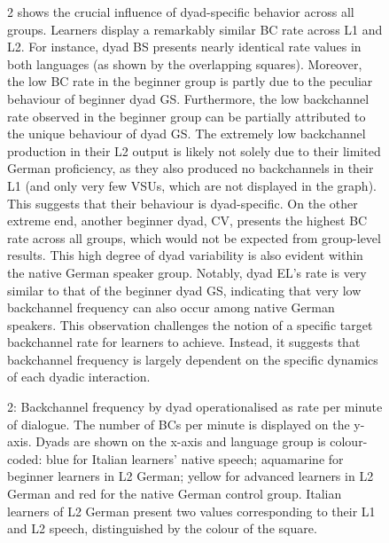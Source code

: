 \begin{figure}
\caption{2 shows the crucial influence of dyad-specific behavior across all groups. Learners display a remarkably similar BC rate across L1 and L2. For instance, dyad BS presents nearly identical rate values in both languages (as shown by the overlapping squares). Moreover, the low BC rate in the beginner group is partly due to the peculiar behaviour of beginner dyad GS. Furthermore, the low backchannel rate observed in the beginner group can be partially attributed to the unique behaviour of dyad GS. The extremely low backchannel production in their L2 output is likely not solely due to their limited German proficiency, as they also produced no backchannels in their L1 (and only very few VSUs, which are not displayed in the graph). This suggests that their behaviour is dyad-specific. On the other extreme end, another beginner dyad, CV, presents the highest BC rate across all groups, which would not be expected from group-level results. This high degree of dyad variability is also evident within the native German speaker group. Notably, dyad EL's rate is very similar to that of the beginner dyad GS, indicating that very low backchannel frequency can also occur among native German speakers. This observation challenges the notion of a specific target backchannel rate for learners to achieve. Instead, it suggests that backchannel frequency is largely dependent on the specific dynamics of each dyadic interaction.}
\label{fig:key:4}
\end{figure}

  
 

\begin{stylecaption}\begin{figure}
\caption{2: Backchannel frequency by dyad operationalised as rate per minute of dialogue. The number of BCs per minute is displayed on the y-axis. Dyads are shown on the x-axis and language group is colour-coded: blue for Italian learners’ native speech; aquamarine for beginner learners in L2 German; yellow for advanced learners in L2 German and red for the native German control group. Italian learners of L2 German present two values corresponding to their L1 and L2 speech, distinguished by the colour of the square.}
\label{fig:key:4}
\end{figure}\end{stylecaption}

